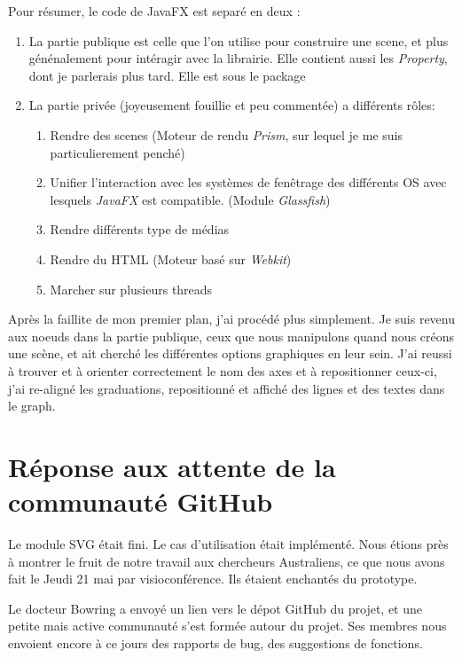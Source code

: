 Pour résumer, le code de JavaFX est separé en deux :
\begin{enumerate}
\item La partie publique est celle que l'on utilise pour construire une scene, et plus génénalement pour intéragir avec la librairie. Elle contient aussi les \textit{Property}, dont je parlerais plus tard. Elle est sous le package %
\item La partie privée (joyeusement fouillie et peu commentée) a différents rôles:%
  \begin{enumerate}	
  \item Rendre des scenes (Moteur de rendu \textit{Prism}, sur lequel je me suis particulierement penché)
  \item Unifier l'interaction avec les systèmes de fenêtrage des différents OS avec lesquels \textit{JavaFX} est compatible. (Module \textit{Glassfish})
  \item Rendre différents type de médias
  \item Rendre du HTML (Moteur basé sur \textit{Webkit})
  \item Marcher sur plusieurs threads
  \end{enumerate}
\end{enumerate}

Après la faillite de mon premier plan, j'ai procédé plus simplement. Je suis revenu aux noeuds dans la partie publique, ceux que nous manipulons quand nous créons une scène, et ait cherché les différentes options graphiques en leur sein. J'ai reussi à trouver et à orienter correctement le nom des axes et à repositionner ceux-ci, j'ai re-aligné les graduations, repositionné et affiché des lignes et des textes dans le graph.

%
%
%
\section{Réponse aux attente de la communauté GitHub}
Le module SVG était fini. Le cas d'utilisation était implémenté. Nous étions près à montrer le fruit de notre travail aux chercheurs Australiens, ce que nous avons fait le Jeudi%
21 mai par visioconférence. Ils étaient enchantés du prototype.

Le docteur Bowring a envoyé un lien vers le dépot GitHub du projet, et une petite mais active communauté s'est formée autour du projet. Ses membres nous envoient encore à ce jours des rapports de bug, des suggestions de fonctions.

